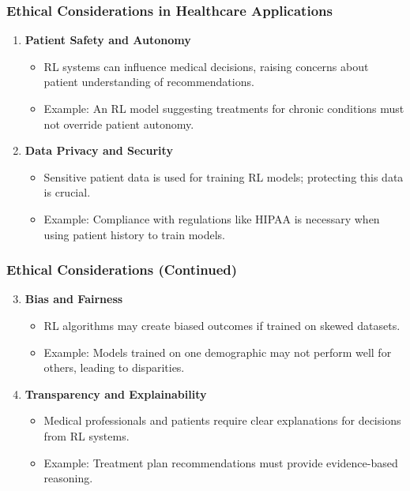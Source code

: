 \documentclass{beamer}
\begin{document}
\begin{frame}[fragile]
    \frametitle{Ethical Considerations in Healthcare Applications}
    \begin{enumerate}
        \item \textbf{Patient Safety and Autonomy}
            \begin{itemize}
                \item RL systems can influence medical decisions, raising concerns about patient understanding of recommendations.
                \item Example: An RL model suggesting treatments for chronic conditions must not override patient autonomy.
            \end{itemize}
        \item \textbf{Data Privacy and Security}
            \begin{itemize}
                \item Sensitive patient data is used for training RL models; protecting this data is crucial.
                \item Example: Compliance with regulations like HIPAA is necessary when using patient history to train models.
            \end{itemize}
    \end{enumerate}
\end{frame}

\begin{frame}[fragile]
    \frametitle{Ethical Considerations (Continued)}
    \begin{enumerate}
        \setcounter{enumi}{2}
        \item \textbf{Bias and Fairness}
            \begin{itemize}
                \item RL algorithms may create biased outcomes if trained on skewed datasets.
                \item Example: Models trained on one demographic may not perform well for others, leading to disparities.
            \end{itemize}
        \item \textbf{Transparency and Explainability}
            \begin{itemize}
                \item Medical professionals and patients require clear explanations for decisions from RL systems.
                \item Example: Treatment plan recommendations must provide evidence-based reasoning.
            \end{itemize}
    \end{enumerate}
\end{frame}
\end{document}
